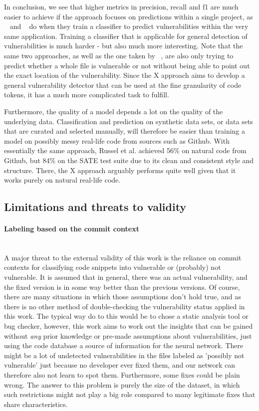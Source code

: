 \documentclass[
a4paper,
pagesize,
pdftex,
12pt,
twoside, %
BCOR=5mm, %
ngerman,
fleqn,
final,
]{scrartcl}
\begin{document}
	In conclusion, we see that higher metrics in precision, recall and f1 are much easier to achieve if the approach focuses on predictions within a single project, as ~\cite{Hovsepyan.2012} and ~\cite{Dam.2017} do when they train a classifier to predict vulnerabilities within the very same application. Training a classifier that is applicable for general detection of vulnerabilities is much harder - but also much more interesting. Note that the same two approaches, as well as the one taken by  ~\cite{Pang.2015}, are also only trying to predict whether a whole file is vulnerable or not without being able to point out the exact location of the vulnerability. Since the X approach aims to develop a general vulnerability detector that can be used at the fine granularity of code tokens, it has a much more complicated task to fulfill.
	
	Furthermore, the quality of a model depends a lot on the quality of the underlying data. Classification and prediction on synthetic data sets, or data sets that are curated and selected manually, will therefore be easier than training a model on possibly messy real-life code from sources such as Github. With essentially the same approach, Russel et al. achieved 56\% on natural code from Github, but 84\% on the SATE test suite due to its clean and consistent style and structure. There, the X approach arguably performs quite well given that it works purely on natural real-life code. 
	
	
	
	
	
	
	
	\subsection{Limitations and threats to validity}
	
	\paragraph{Labeling based on the commit context}\mbox{}\\
	A major threat to the external validity of this work is the reliance on commit contexts for classifying code snippets into vulnerable or (probably) not vulnerable. It is assumed that in general, there was an actual vulnerability, and the fixed version is in some way better than the previous versions. Of course, there are many situations in which those assumptions don't hold true, and as there is no other method of double-checking the vulnerability status applied in this work. The typical way do to this would be to chose a static analysis tool or bug checker, however, this work aims to work out the insights that can be gained without \textit{any} prior knowledge or pre-made assumptions about vulnerabilities, just using the code database a source of information for the neural network. There might be a lot of undetected vulnerabilities in the files labeled as 'possibly not vulnerable' just because no developer ever fixed them, and our network can therefore also not learn to spot them. Furthermore, some fixes could be plain wrong. The answer to this problem is purely the size of the dataset, in which such restrictions might not play a big role compared to many legitimate fixes that share characteristics.
\end{document}
